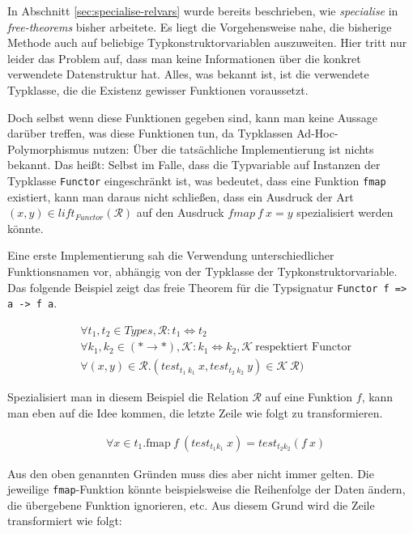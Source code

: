 In Abschnitt \ref{sec:specialise-relvars} wurde bereits beschrieben, wie \textit{specialise} in \textit{free-theorems} bisher arbeitete.
Es liegt die Vorgehensweise nahe, die bisherige Methode auch auf beliebige Typkonstruktorvariablen auszuweiten. Hier tritt nur leider
das Problem auf, dass man keine Informationen über die konkret verwendete Datenstruktur hat. Alles, was bekannt ist, ist die
verwendete Typklasse, die die Existenz gewisser Funktionen voraussetzt.

Doch selbst wenn diese Funktionen gegeben sind, kann man keine Aussage darüber treffen, was diese Funktionen tun, da
Typklassen Ad-Hoc-Polymorphismus nutzen: Über die tatsächliche Implementierung ist nichts bekannt. Das heißt: Selbst im Falle, dass
die Typvariable auf Instanzen der Typklasse \texttt{Functor} eingeschränkt ist, was bedeutet, dass eine Funktion \texttt{fmap}
existiert, kann man daraus nicht schließen, dass ein Ausdruck der Art $(x, y) \in lift_{Functor}(\mathcal{R})$ auf den Ausdruck
$fmap\ f\ x = y$ spezialisiert werden könnte.

Eine erste Implementierung sah die Verwendung unterschiedlicher Funktionsnamen vor, abhängig von der Typklasse der
Typkonstruktorvariable. Das folgende Beispiel zeigt das freie Theorem für die Typsignatur \texttt{Functor f => a -> f a}.

\begin{align*}
& \forall t_1, t_2 \in Types, \mathcal{R} : t_1 \Leftrightarrow t_2 \\
& \forall k_1, k_2 \in (* \rightarrow *), \mathcal{K} : k_1 \Leftrightarrow k_2, \mathcal{K}\ \text{respektiert Functor} \\
& \forall (x, y) \in \mathcal{R} . (test_{t_1\ k_1}\ x, test_{t_2\ k_2}\ y) \in \mathcal{K}\ \mathcal{R})
\end{align*}

Spezialisiert man in diesem Beispiel die Relation $\mathcal{R}$ auf eine Funktion $f$, kann man eben auf die Idee kommen, die letzte
Zeile wie folgt zu transformieren.

\begin{align*}
& \forall x \in t_1 . \text{fmap}\ f\ (test_{t_1 k_1}\ x) = test_{t_2 k_2} (f\ x)
\end{align*}

Aus den oben genannten Gründen muss dies aber nicht immer gelten. Die jeweilige \texttt{fmap}-Funktion könnte beispielsweise
die Reihenfolge der Daten ändern, die übergebene Funktion ignorieren, etc.
Aus diesem Grund wird die Zeile transformiert wie folgt:

